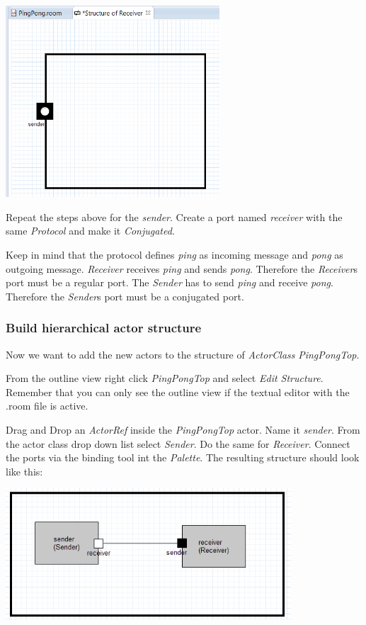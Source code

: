 \includegraphics[width=0.6\textwidth]{images/017-04-Port-for-Actor-Receiver.png}

Repeat the steps above for the \textit{sender}. Create a port named \emph{receiver} with the same \emph{Protocol} and make it \emph{Conjugated}.

Keep in mind that the protocol defines \textit{ping} as incoming message and \textit{pong} as outgoing message. 
\textit{Receiver} receives \emph{ping} and sends \emph{pong}. Therefore the \textit{Receiver}s port must be a 
regular port. The \textit{Sender} has to send \textit{ping} and receive \textit{pong}. Therefore the \textit{Sender}s port must be a conjugated port.

\subsubsection{Build hierarchical actor structure}

Now we want to add the new actors to the structure of \emph{ActorClass} \emph{PingPongTop}.

From the outline view right click \textit{PingPongTop} and select \textit{Edit Structure}. Remember that you can only see the outline view if the textual editor with the .room file is active.

Drag and Drop an \textit{ActorRef} inside the \textit{PingPongTop} actor. Name it \textit{sender}. From the actor class drop down list select \textit{Sender}. Do the same for \textit{Receiver}. Connect the ports 
via the binding tool int the \emph{Palette}. The resulting structure should look like this:

\includegraphics[width=0.8\textwidth]{images/017-03-PingPongTop-Structure.png}

